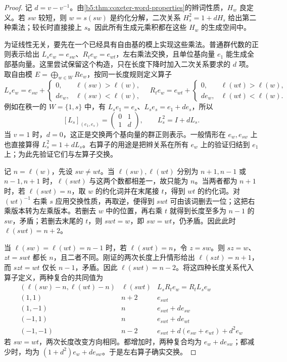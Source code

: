 \begin{proof}
	记 \(d=v-v^{-1}\)。由\cref{b5:thm:coxeter-word-properties}的辫词性质，\(H_w\) 良定义。若 \(sw\) 较短，则 \(w=s(sw)\) 是约化分解，二次关系 \(H_s^2=1+dH_s\) 给出第二种乘法；较长时直接接上 \(s\)。因此所有生成元乘积都在这些 \(H_w\) 的生成空间中。

	为证线性无关，要先在一个已经具有自由基的模上实现这些乘法。普通群代数的正则表示给出 \(L_se_w=e_{sw}\)、\(R_te_w=e_{wt}\)，左右乘法交换，且单位基向量 \(e_1\) 能生成全部基向量。这里尝试保留这个构造，只在长度下降时加入二次关系要求的 \(d\) 项。取自由模 \(E=\bigoplus_{w\in W}Re_w\)，按同一长度规则定义算子
	\[
		L_se_w=e_{sw}+\begin{cases}0,&\ell(sw)>\ell(w),\\de_w,&\ell(sw)<\ell(w),\end{cases}
		\quad
		R_te_w=e_{wt}+\begin{cases}0,&\ell(wt)>\ell(w),\\de_w,&\ell(wt)<\ell(w).\end{cases}
	\]
	例如在秩一的 \(W=\{1,s\}\) 中，有 \(L_se_1=e_s\)、\(L_se_s=e_1+de_s\)，所以
	\[
		[L_s]_{(e_1,e_s)}=\begin{pmatrix}0&1\\1&d\end{pmatrix},
		\qquad L_s^2=I+dL_s.
	\]
	当 \(v=1\) 时，\(d=0\)，这正是交换两个基向量的群正则表示。一般情形在 \(e_w,e_{sw}\) 上也直接算得 \(L_s^2=1+dL_s\)。右算子的用途是把辫关系在所有 \(e_w\) 上的验证归结到 \(e_1\) 上；为此先验证它们与左算子交换。

	记 \(n=\ell(w)\)，先设 \(sw\ne wt\)。当 \(\ell(sw),\ell(wt)\) 分别为 \(n+1,n-1\) 或 \(n-1,n+1\) 时，\(\ell(swt)\) 与这两个数都相差一，故只能为 \(n\)。当两者都为 \(n+1\) 时，若 \(\ell(swt)=n\)，取 \(w\) 的约化词并在末尾接 \(t\)，得到 \(wt\) 的约化词。对 \((wt)^{-1}\) 右乘 \(s\) 应用交换性质，再取逆，便得到 \(swt\) 可由该词删去一位；这把右乘版本转为左乘版本。若删去 \(w\) 中的位置，再右乘 \(t\) 就得到长度至多为 \(n-1\) 的 \(sw\)，矛盾；若删去末尾的 \(t\)，则 \(swt=w\)，即 \(sw=wt\)，仍矛盾。因此此时 \(\ell(swt)=n+2\)。

	当 \(\ell(sw)=\ell(wt)=n-1\) 时，若 \(\ell(swt)=n\)，令 \(z=sw\)。则 \(sz=w\)、\(zt=swt\) 都长 \(n\)，且二者不同。刚证的两次长度上升情形给出 \(\ell(szt)=n+1\)，而 \(szt=wt\) 仅长 \(n-1\)，矛盾。因此 \(\ell(swt)=n-2\)。将这四种长度关系代入算子定义，两种复合的共同值为
	\[
		\begin{array}{c|c|l}
			(\ell(sw)-n,\ell(wt)-n)&\ell(swt)&L_sR_te_w=R_tL_se_w\\\hline (1,1)&n+2&e_{swt}\\
			(1,-1)&n&e_{swt}+de_{sw}\\
			(-1,1)&n&e_{swt}+de_{wt}\\
			(-1,-1)&n-2&e_{swt}+d(e_{sw}+e_{wt})+d^2e_w
		\end{array}
	\]
	若 \(sw=wt\)，两次长度改变方向相同。都增加时，两种复合均为 \(e_w+de_{sw}\)；都减少时，均为 \((1+d^2)e_w+de_{sw}\)。于是左右算子确实交换。


\end{proof}
